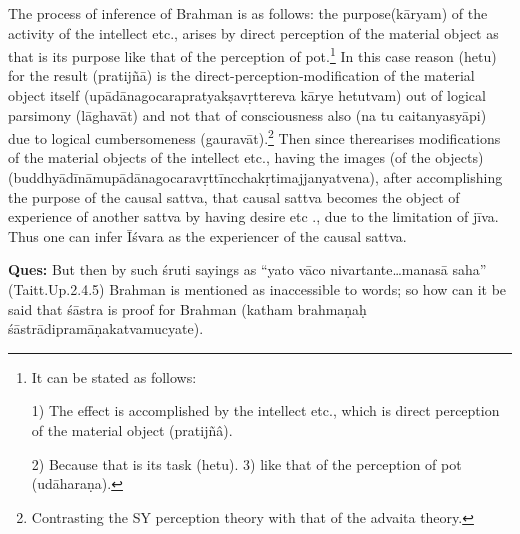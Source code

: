 \vskip -2pt


\vskip -2pt


\vskip -2pt

The process of inference of Brahman is as follows: the purpose\break (kāryam) of the activity of the intellect etc., arises by direct perception of the material object as that is its purpose like that of the perception of pot.\footnote{It can be stated as follows:

1) The effect is accomplished by the intellect etc., which is direct perception of the material object (pratijñâ).

2) Because that is its task (hetu). 3) like that of the perception of pot (udāharaṇa).} In this case reason (hetu) for the result (pratijñā) is the direct-perception-modification of the material object itself (upādānagocarapratyakṣavṛttereva kārye hetutvam) out of logical parsimony (lāghavāt) and not that of consciousness also (na tu caitanyasyā\-pi) due to logical cumbersomeness (gauravāt).\footnote{Contrasting the SY perception theory with that of the advaita theory.} Then since there\break arises modifications of the material objects of the intellect etc., having the images (of the objects) (buddhyādīnāmupādānagocaravṛttīncchakṛtimajjanyatvena), after accomplishing the purpose of the causal sattva, that causal sattva becomes the object of experience of another sattva by having desire etc ., due to the limitation of jīva. Thus one can infer Īśvara as the experiencer of the causal sattva.

\textbf{Ques:} But then by such śruti sayings as “yato vāco nivartante…manasā saha” (Taitt.Up.2.4.5) Brahman is mentioned as inaccessible to words; so how can it be said that  śāstra is proof for Brahman (katham brahmaṇaḥ śāstrādipramāṇakatvamucyate).

